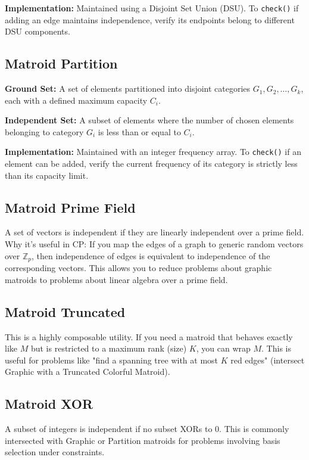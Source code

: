 \textbf{Implementation:} Maintained using a Disjoint Set Union (DSU). To \texttt{check()} if adding an edge maintains independence, verify its endpoints belong to different DSU components.

\subsection{Matroid Partition}
\textbf{Ground Set:} A set of elements partitioned into disjoint categories $G_1, G_2, \dots, G_k$, each with a defined maximum capacity $C_i$.

\textbf{Independent Set:} A subset of elements where the number of chosen elements belonging to category $G_i$ is less than or equal to $C_i$.

\textbf{Implementation:} Maintained with an integer frequency array. To \texttt{check()} if an element can be added, verify the current frequency of its category is strictly less than its capacity limit.

\subsection{Matroid Prime Field}
A set of vectors is independent if they are linearly independent over a prime field. Why it's useful in CP: If you map the edges of a graph to generic random vectors over $\mathbb{Z}_p$, then independence of edges is equivalent to independence of the corresponding vectors. This allows you to reduce problems about graphic matroids to problems about linear algebra over a prime field.

\subsection{Matroid Truncated}
This is a highly composable utility. If you need a matroid that behaves exactly like $M$ but is restricted to a maximum rank (size) $K$, you can wrap $M$. This is useful for problems like "find a spanning tree with at most $K$ red edges" (intersect Graphic with a Truncated Colorful Matroid).

\subsection{Matroid XOR}
A subset of integers is independent if no subset XORs to $0$. This is commonly intersected with Graphic or Partition matroids for problems involving basis selection under constraints.

